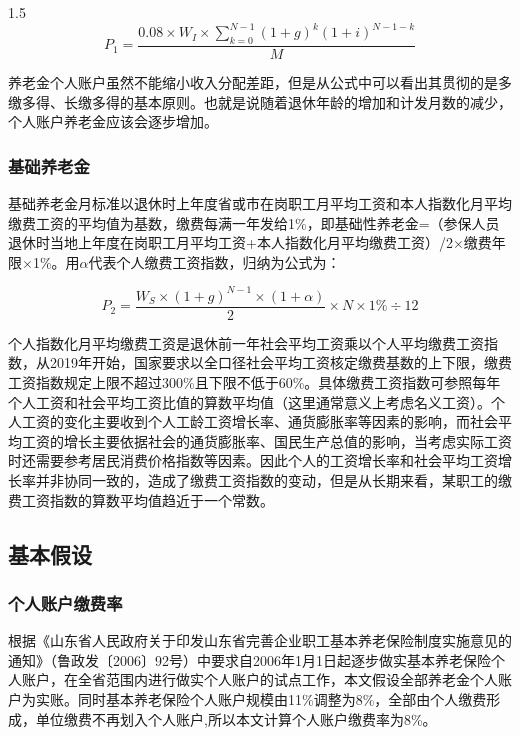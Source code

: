 \documentclass[a4paper,12pt]{ctexart}
\numberwithin{equation}{section}
\begin{document}
\begin{spacing}{1.5}
\begin{equation}
P_1 = \frac{0.08 \times W_I \times \sum_{k=0}^{N-1}(1+g)^k(1+i)^{N-1-k}}{M}
\end{equation}

养老金个人账户虽然不能缩小收入分配差距，但是从公式中可以看出其贯彻的是多缴多得、长缴多得的基本原则。也就是说随着退休年龄的增加和计发月数的减少，个人账户养老金应该会逐步增加。

\subsubsection{基础养老金}

基础养老金月标准以退休时上年度省或市在岗职工月平均工资和本人指数化月平均缴费工资的平均值为基数，缴费每满一年发给1\%，即基础性养老金=（参保人员退休时当地上年度在岗职工月平均工资+本人指数化月平均缴费工资）/2$\times$缴费年限$\times$1\%。用$\alpha$代表个人缴费工资指数，归纳为公式为：

\begin{equation}
P_2 = \frac{W_S \times (1+g)^{N-1} \times (1+\alpha)}{2} \times N \times 1\% \div 12
\end{equation}

个人指数化月平均缴费工资是退休前一年社会平均工资乘以个人平均缴费工资指数，从2019年开始，国家要求以全口径社会平均工资核定缴费基数的上下限，缴费工资指数规定上限不超过300\%且下限不低于60\%。具体缴费工资指数可参照每年个人工资和社会平均工资比值的算数平均值（这里通常意义上考虑名义工资）。个人工资的变化主要收到个人工龄工资增长率、通货膨胀率等因素的影响，而社会平均工资的增长主要依据社会的通货膨胀率、国民生产总值的影响，当考虑实际工资时还需要参考居民消费价格指数等因素。因此个人的工资增长率和社会平均工资增长率并非协同一致的，造成了缴费工资指数的变动，但是从长期来看，某职工的缴费工资指数的算数平均值趋近于一个常数。

\subsection{基本假设}

\subsubsection{个人账户缴费率}

根据《山东省人民政府关于印发山东省完善企业职工基本养老保险制度实施意见的通知》（鲁政发〔2006〕92号）中要求自2006年1月1日起逐步做实基本养老保险个人账户，在全省范围内进行做实个人账户的试点工作，本文假设全部养老金个人账户为实账。同时基本养老保险个人账户规模由11\%调整为8\%，全部由个人缴费形成，单位缴费不再划入个人账户,所以本文计算个人账户缴费率为8\%。


\end{spacing}
\end{document}
